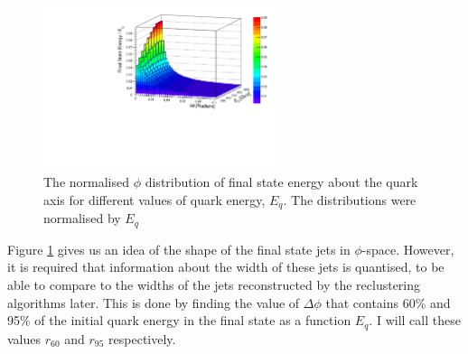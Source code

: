 \documentclass[a4paper,11pt, onecolumn]{article}
\begin{document}
  
  \vspace{+0.05cm}
  \begin{figure}[ht]
    \begin{center}
      \includegraphics[width = 0.6\textwidth]{lego_plot}
      \caption{The normalised $\phi$ distribution of final state energy about the quark axis for different values of quark energy, $E_{q}$.
               The distributions were normalised by $E_{q}$}
      \label{lego_plot}
    \end{center}
  \end{figure}
  \vspace{-0.25cm}

  Figure \ref{lego_plot} gives us an idea of the shape of the final state jets in $\phi$-space. However, it is required that information about the width of these 
  jets is quantised, to be able to compare to the widths of the jets reconstructed by the reclustering algorithms later. This is done by finding the value of 
  $\Delta\phi$ that contains 60\% and 95\% of the initial quark energy in the final state as a function $E_{q}$. I will call these values $r_{60}$ and $r_{95}$ 
  respectively. \\
  
\end{document}

